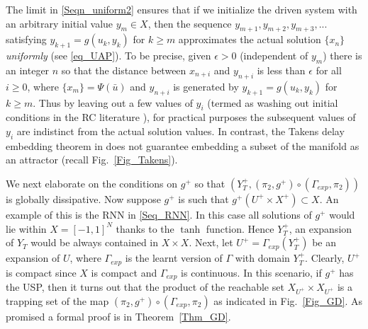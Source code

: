 \documentclass[12 pt]{article}
\begin{document}
The limit in \eqref{Seqn_uniform2} ensures that if we initialize the driven system
with an arbitrary initial value $y_m \in X$, then the sequence $y_{m+1}, y_{m+2}, y_{m+3},...$ satisfying $y_{k+1}= g(u_k,y_k)$ for $k \geq m$ approximates the actual solution $\{x_n\}$ \textit{uniformly} (see \eqref{eq_UAP}). To be precise, given $\epsilon>0$ (independent of $y_m$) there is an integer $n$ so that the distance between  $x_{n+i}$ and $y_{n+i}$ is less than $\epsilon$ for all $i\ge 0$, where $\{x_m\} = \Psi(\bar{u})$  and $y_{n+i}$ is generated by $y_{k+1} = g(u_k,y_k)$ for $k\ge m$. Thus by leaving out a few values of $y_i$ (termed as washing out initial conditions in the RC literature \cite{jaeger2004harnessing}), for practical purposes the subsequent values of $y_i$ are indistinct from the actual solution values. In contrast, the Takens delay embedding theorem in \cite{takens1981detecting} does not guarantee embedding a subset of the manifold as an attractor (recall Fig.~\ref{Fig_Takens}). 



We next elaborate on the conditions on $g^+$ so that $(Y_T^+, (\pi_2,g^+) \circ (\Gamma_{exp},\pi_2))$ is globally dissipative.   Now suppose $g^+$ is such that  $g^+(U^+\times X^+) \subset X$. An example of this is the RNN in \eqref{Seq_RNN}. In this case all solutions of $g^+$ would lie within $X=[-1,1]^N$ thanks to the $\tanh$ function. Hence $Y_T^+$, an expansion of $Y_T$ would be always contained in $X \times X$. Next, let $U^+ = \Gamma_{exp}(Y_T^+)$ be an expansion of $U$, where $\Gamma_{exp}$ is the learnt version of $\Gamma$ with domain $Y_T^+$.  Clearly, $U^+$ is compact since $X$ is compact and $\Gamma_{exp}$ is continuous.  In this scenario, if $g^+$ has the USP, then it turns out that the product of the reachable set $X_{U^{+}} \times X_{U^{+}}$ is a trapping set of the map $(\pi_2,g^+) \circ (\Gamma_{exp},\pi_2)$ as indicated in Fig.~\ref{Fig_GD}. As promised a formal proof is in Theorem~\ref{Thm_GD}. 


\end{document}
